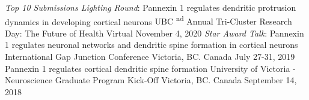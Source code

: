 


\begin{cventries}
  \cventry
  {\textit{Top 10 Submissions Lighting Round}: Pannexin 1 regulates dendritic protrusion dynamics in developing cortical neurons}
  {UBC \textsuperscript{nd} Annual Tri-Cluster Research Day: The Future of Health}
  {Virtual}
  {November 4, 2020}
  \cventry
    {\textit{Star Award Talk}: Pannexin 1 regulates neuronal networks and dendritic spine formation in cortical neurons} %
    {International Gap Junction Conference} %
    {Victoria, BC. Canada} %
    {July 27-31, 2019} %
    \cventry
    {Pannexin 1 regulates cortical dendritic spine formation} %
    {University of Victoria - Neuroscience Graduate Program Kick-Off} %
    {Victoria, BC. Canada} %
    {September 14, 2018} %

\end{cventries}
